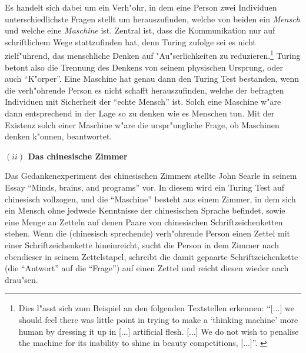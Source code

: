 \documentclass[a4paper, emulatestandardclasses, 12pt]{scrartcl}
\begin{document}
\begin{onehalfspace}
Es handelt sich dabei um ein Verh"ohr, in dem eine Person zwei Individuen unterschiedlichste Fragen stellt um herauszufinden, welche von beiden ein \emph{Mensch} und welche eine \emph{Maschine} ist. Zentral ist, dass die Kommunikation nur auf schriftlichem Wege stattzufinden hat, denn Turing zufolge sei es nicht zielf"uhrend, das menschliche Denken auf "Au"serlichkeiten zu reduzieren.\footnote{Dies l"asst sich zum Beispiel an den folgenden Textstellen erkennen: "`[...] we should feel there was little point in trying to make a `thinking machine' more human by dressing it up in [...] artificial flesh. [...] We do not wish to penalise the machine for its inability to shine in beauty competitions, [...]"'. \citep[S. 434]{turing1950computing}} Turing betont also die Trennung des Denkens von seinem physischen Ursprung, oder auch "`K"orper"'. Eine Maschine hat genau dann den Turing Test bestanden, wenn die verh"ohrende Person es nicht schafft herauszufinden, welche der befragten Individuen mit Sicherheit der "`echte Mensch"' ist. Solch eine Maschine w"are dann entsprechend in der Lage so zu denken wie es Menschen tun. Mit der Existenz solch einer Maschine w"are die urspr"ungliche Frage, ob Maschinen denken k"onnen, beantwortet.


\vspace{5mm}
\noindent\textbf{$(ii)$ Das chinesische Zimmer}

\noindent Das Gedankenexperiment des chinesischen Zimmers stellte John Searle in seinem Essay "`Minds, brains, and programs"' \citep{searle1980minds} vor. In diesem wird ein Turing Test auf chinesisch vollzogen, und die "`Maschine"' besteht aus einem Zimmer, in dem sich ein Mensch ohne jedwede Kenntnisse der chinesischen Sprache befindet, sowie eine Menge an Zetteln auf denen Paare von chinesischen Schriftzeichenketten stehen. Wenn die (chinesisch sprechende) verh"ohrende Person einen Zettel mit einer Schriftzeichenkette hineinreicht, sucht die Person in dem Zimmer nach ebendieser in seinem Zettelstapel, schreibt die damit gepaarte Schriftzeichenkette (die "`Antwort"' auf die "`Frage"') auf einen Zettel und reicht diesen wieder nach drau"sen. 


\end{onehalfspace}
\end{document}
